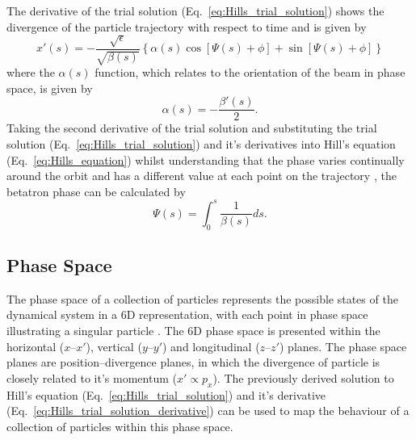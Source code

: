 \documentclass[../main.tex]{subfiles}
\begin{document}
The derivative of the trial solution (Eq.~\ref{eq:Hills_trial_solution}) shows the divergence of the particle trajectory with respect to time and is given by
\begin{equation}
x'\left(s\right) = -\frac{\sqrt{\epsilon}}{\sqrt{\beta\left(s\right)}}\left\{\alpha\left(s\right)\cos\left[\Psi\left(s\right)+\phi\right]+\sin\left[\Psi\left(s\right)+\phi\right]\right\}
\label{eq:Hills_trial_solution_derivative}    
\end{equation}
where the $\alpha\left(s\right)$ function, which relates to the orientation of the beam in phase space, is given by
\begin{equation}
\alpha\left(s\right) = -\frac{\beta'\left(s\right)}{2}.
\label{eq:alpha_function}    
\end{equation}
Taking the second derivative of the trial solution and substituting the trial solution (Eq.~\ref{eq:Hills_trial_solution}) and it's derivatives into Hill's equation (Eq.~\ref{eq:Hills_equation}) whilst understanding that the phase varies continually around the orbit and has a different value at each point on the trajectory \cite{wille2000physics}, the betatron phase can be calculated by
\begin{equation}
\Psi\left(s\right) = \int_{0}^{s}\frac{1}{\beta\left(s\right)}ds.
\label{eq:betatron_phase}    
\end{equation}

\subsection{Phase Space}

The phase space of a collection of particles represents the possible states of the dynamical system in a 6D representation, with each point in phase space illustrating a singular particle \cite{jones2016design}. The 6D phase space is presented within the horizontal ($x$--$x'$), vertical ($y$--$y'$) and longitudinal ($z$--$z'$) planes. The phase space planes are position--divergence planes, in which the divergence of particle is closely related to it's momentum ($x' \propto p_{x}$). The previously derived solution to Hill's equation (Eq.~\ref{eq:Hills_trial_solution}) and it's derivative (Eq.~\ref{eq:Hills_trial_solution_derivative}) can be used to map the behaviour of a collection of particles within this phase space. 
\end{document}
